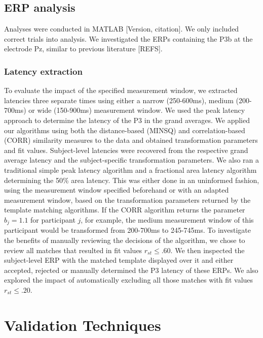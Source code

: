 \documentclass[
  man,floatsintext]{apa7}
\begin{document}
\hypertarget{erp-analysis}{%
\subsection{ERP analysis}\label{erp-analysis}}

Analyses were conducted in MATLAB {[}Version, citation{]}. We only included correct trials into analysis. We investigated the ERPs containing the P3b at the electrode Pz, similar to previous literature {[}REFS{]}.

\hypertarget{latency-extraction}{%
\subsubsection{Latency extraction}\label{latency-extraction}}

To evaluate the impact of the specified measurement window, we extracted latencies three separate times using either a narrow (250-600ms), medium (200-700ms) or wide (150-900ms) measurement window. We used the peak latency approach to determine the latency of the P3 in the grand averages. We applied our algorithms using both the distance-based (MINSQ) and correlation-based (CORR) similarity measures to the data and obtained transformation parameters and fit values. Subject-level latencies were recovered from the respective grand average latency and the subject-specific transformation parameters.
We also ran a traditional simple peak latency algorithm and a fractional area latency algorithm determining the 50\% area latency. This was either done in an uninformed fashion, using the measurement window specified beforehand or with an adapted measurement window, based on the transformation parameters returned by the template matching algorithms. If the CORR algorithm returns the parameter \(b_j = 1.1\) for participant \(j\), for example, the medium measurement window of this participant would be transformed from 200-700ms to 245-745ms.
To investigate the benefits of manually reviewing the decisions of the algorithm, we chose to review all matches that resulted in fit values \(r_{st} \le .60\). We then inspected the subject-level ERP with the matched template displayed over it and either accepted, rejected or manually determined the P3 latency of these ERPs.
We also explored the impact of automatically excluding all those matches with fit values \(r_{st} \le .20\).

\hypertarget{validation-techniques}{%
\section{Validation Techniques}\label{validation-techniques}}
\end{document}
